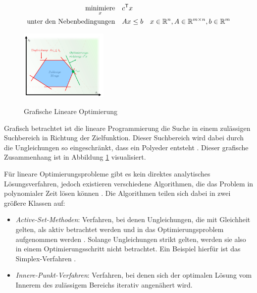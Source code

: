 \begin{align}
    \label{eqn:linear-programming}
    \operatorname*{minimiere}_{x} & \quad c^\mathsf{T} x \\
    \text{unter den Nebenbedingungen} & \quad Ax \leq b & x \in \mathbb{R}^{n}, A \in \mathbb{R}^{m\times n}, b \in \mathbb{R}^{m} \notag
\end{align}

\begin{figure}
    \centering
    \vspace*{-0.75cm}
    \includegraphics[width=0.38\textwidth]{res/pictures/linear-programming.png}
    \caption[Grafische Lineare Optimierung]{\unskip}
    Grafische Lineare Optimierung
    \label{fig:linear-programming}
    \vspace*{-0.75cm}
\end{figure}

Grafisch betrachtet ist die lineare Programmierung die Suche in einem zulässigen Suchbereich in Richtung der Zielfunktion. Dieser Suchbereich wird dabei durch die Ungleichungen so eingeschränkt, dass ein Polyeder entsteht \cite[S. 31]{2023.ConvexOptimization}. Dieser grafische Zusammenhang ist in Abbildung \ref{fig:linear-programming} visualisiert.

Für lineare Optimierungsprobleme gibt es kein direktes analytisches Lösungsverfahren, jedoch existieren verschiedene Algorithmen, die das Problem in polynomialer Zeit lösen können \cite[S. 6]{2023.ConvexOptimization}. Die Algorithmen teilen sich dabei in zwei größere Klassen auf:

\begin{itemize}
    \item \emph{Active-Set-Methoden}: Verfahren, bei denen Ungleichungen, die mit Gleichheit gelten, als aktiv betrachtet werden und in das Optimierungsproblem aufgenommen werden \cite[S. 243]{2023.OptimizationLectureNotes}. Solange Ungleichungen strikt gelten, werden sie also in einem Optimierungsschritt nicht betrachtet. Ein Beispiel hierfür ist das Simplex-Verfahren \cite[S. 248]{2023.OptimizationLectureNotes}.
    \item \emph{Innere-Punkt-Verfahren}: Verfahren, bei denen sich der optimalen Lösung vom Innerem des zulässigem Bereichs iterativ angenähert wird. \cite[S. 261]{2023.InteriorPoint}
\end{itemize}

